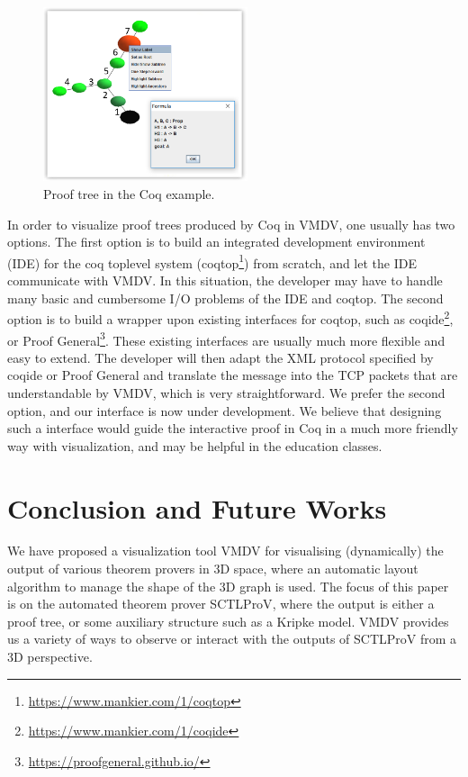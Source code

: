 \documentclass[runningheads]{llncs}
\newcommand\tool[1]{\textsf{#1}}
\newcommand\vmdv{\tool{VMDV}}
\begin{document}
\begin{figure}
\centering
\includegraphics[width=6cm]{./coq_example.png}
\caption{Proof tree in the Coq example.}
\label{fig:coq_example}
\end{figure}
In order to visualize proof trees produced by Coq in \vmdv{}, one usually has two options. The first option is to build an integrated development environment (IDE) for the coq toplevel system (coqtop\footnote{\url{https://www.mankier.com/1/coqtop}}) from scratch, and let the IDE communicate with \vmdv{}. In this situation, the developer may have to handle many basic and cumbersome I/O problems of the IDE and coqtop. The second option is to build a wrapper upon existing interfaces for coqtop, such as coqide\footnote{\url{https://www.mankier.com/1/coqide}}, or Proof General\footnote{\url{https://proofgeneral.github.io/}}. These existing interfaces are usually much more flexible and easy to extend. The developer will then adapt the XML protocol specified by coqide or Proof General and translate the message into the TCP packets that are understandable by \vmdv{}, which is very straightforward. We prefer the second option, and our interface is now under development. We believe that designing such a interface would guide the interactive proof in Coq in a much more friendly way with visualization, and may be helpful in the education classes.

\section{Conclusion and Future Works}

We have proposed a visualization tool \vmdv{} for visualising (dynamically) the output of various theorem provers in 3D space, 
where an automatic layout algorithm to manage the shape of the 3D graph is used.
The focus of this paper is on the automated theorem prover \textsf{SCTLProV}, where the output is either a proof tree, or some auxiliary structure such as a Kripke model.
\vmdv{} provides us a variety of ways to observe or interact with the outputs of \textsf{SCTLProV} from a 3D perspective.
\end{document}
